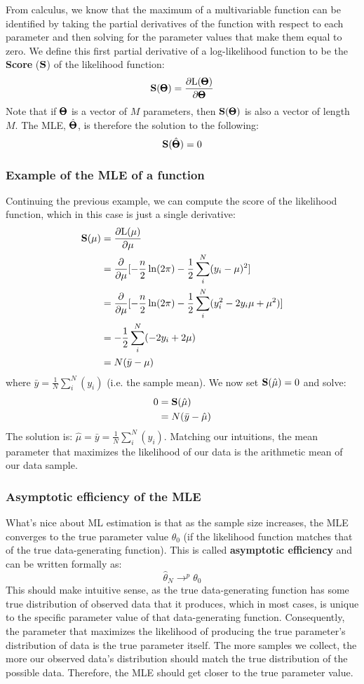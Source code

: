 \documentclass[12pt]{article}
\begin{document}
From calculus, we know that the maximum of a multivariable function can be identified by taking the partial derivatives of the function with respect to each parameter and then solving for the parameter values that make them equal to zero. We define this first partial derivative of a log-likelihood function to be the \textbf{Score} ($\mathbf{S}$) of the likelihood function:
$$
\mathbf{S}(\pmb{\Theta}) =
\frac{ \partial \mathrm{L} (\pmb{\Theta})
}{ \partial \pmb{\Theta} }
$$
Note that if $\pmb{\Theta}$ is a vector of $M$ parameters, then $\mathbf{S}(\pmb{\Theta})$ is also a vector of length $M$.
The MLE, $\hat{\pmb{\Theta}}$, is therefore the solution to the following:
$$ \mathbf{S}(\hat{\pmb{\Theta}}) = 0 $$

\subsubsection{Example of the MLE of a function}
Continuing the previous example, we can compute the score of the likelihood function, which in this case is just a single derivative:
\begin{align*}
\mathbf{S}(\mu) &=
\frac{ \partial \mathrm{L} (\mu)
}{ \partial \mu } \\
&= \frac{ \partial }{ \partial \mu } [
- \frac{n}{2} \ln(2 \pi) -
\frac{1}{2} \sum_i^{N} (y_i - \mu)^2 ] \\
&= \frac{ \partial }{ \partial \mu } [
- \frac{n}{2} \ln(2 \pi) -
\frac{1}{2} \sum_i^{N} (y_i^2 - 2 y_i \mu + \mu^2) ] \\
&= - \frac{1}{2} \sum_i^{N} (- 2 y_i + 2 \mu) \\
&= N ( \bar{y} - \mu)
\end{align*}
where $\bar{y} = \frac{1}{N} \sum_i^N (y_i) $ (i.e. the sample mean). We now set $\mathbf{S}(\hat{\mu}) = 0$ and solve:
\begin{align*}
0 &= \mathbf{S}(\hat{\mu}) \\
&= N ( \bar{y} - \hat{\mu})
\end{align*}
The solution is: $\hat{\mu} = \bar{y} = \frac{1}{N} \sum_i^N (y_i)$.
Matching our intuitions, the mean parameter that maximizes the likelihood of our data is the arithmetic mean of our data sample.

\subsubsection{Asymptotic efficiency of the MLE}
What's nice about ML estimation is that as the sample size increases, the MLE converges to the true parameter value $\theta_0$ (if the likelihood function matches that of the true data-generating function).
This is called \textbf{asymptotic efficiency} and can be written formally as:
$$ \hat{\theta}_N \rightarrow^p \theta_0 $$
This should make intuitive sense, as the true data-generating function has some true distribution of observed data that it produces, which in most cases, is unique to the specific parameter value of that data-generating function.
Consequently, the parameter that maximizes the likelihood of producing the true parameter's distribution of data is the true parameter itself.
The more samples we collect, the more our observed data's distribution should match the true distribution of the possible data.
Therefore, the MLE should get closer to the true parameter value.
\end{document}
